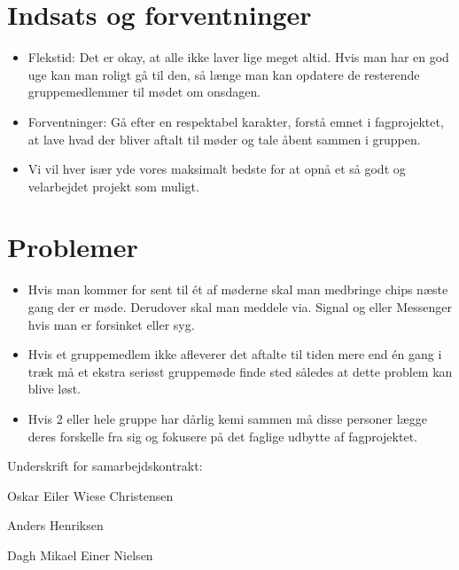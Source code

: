 \documentclass[11pt, fleqn]{article}
\newcommand*\wildcard[2][5cm]{\vspace*{2cm}\parbox{#1}{\hrulefill\par#2}}
\begin{document}
	\section{Indsats og forventninger}
	\begin{itemize}
		\item Flekstid: Det er okay, at alle ikke laver lige meget altid. Hvis man har en god uge kan man roligt gå til den, så længe man kan opdatere de resterende gruppemedlemmer til mødet om onsdagen.
		
		\item Forventninger: Gå efter en respektabel karakter, forstå emnet i fagprojektet, at lave hvad der bliver aftalt til møder og tale åbent sammen i gruppen. 
		
		\item Vi vil hver især yde vores maksimalt bedste for at opnå et så godt og velarbejdet projekt som muligt.
	\end{itemize}
		
	\section{Problemer}	
	\begin{itemize}
		\item Hvis man kommer for sent til ét af møderne skal man medbringe chips næste gang der er møde. Derudover skal man meddele via. Signal og eller Messenger hvis man er forsinket eller syg. 
		
		\item Hvis et gruppemedlem ikke afleverer det aftalte til tiden mere end én gang i træk må et ekstra seriøst gruppemøde finde sted således at dette problem kan blive løst. 
		
		\item Hvis 2 eller hele gruppe har dårlig kemi sammen må disse personer lægge deres forskelle fra sig og fokusere på det faglige udbytte af fagprojektet. 
	\end{itemize} 
	\vspace{0.5cm} Underskrift for samarbejdskontrakt:	\\  \hrulefill 
		
\begingroup
\centering
\wildcard{Oskar Eiler Wiese Christensen}
\hspace{1cm}
\wildcard{Anders Henriksen}
\hspace{1cm}
\wildcard{Dagh Mikael Einer Nielsen}
\par
\endgroup
	
\end{document}
